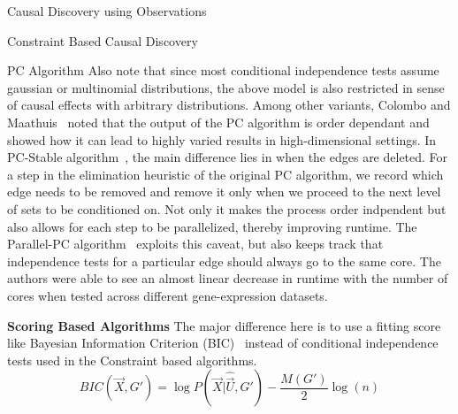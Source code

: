 \documentclass[10pt]{article}
\begin{document}
\begin{psection}[3]{Causal Discovery using Observations}
\begin{psubsection}{Constraint Based Causal Discovery}
\begin{pssubsection}{PC Algorithm}
            Also note that since most conditional independence tests assume gaussian or
            multinomial distributions, the above model is also restricted in sense of
            causal effects with arbitrary distributions. Among other variants, Colombo
            and Maathuis~\cite{colombo2014order} noted that the output of the PC
            algorithm is order dependant and showed how it can lead to highly varied
            results in high-dimensional settings. In PC-Stable
            algorithm~\cite{colombo2014order}, the main difference lies in when the
            edges are deleted. For a step in the elimination heuristic of the original
            PC algorithm, we record which edge needs to be removed and remove it only
            when we proceed to the next level of sets to be conditioned on. Not only it
            makes the process order indpendent but also allows for each step to be
            parallelized, thereby improving runtime. The Parallel-PC
            algorithm~\cite{le2016fast} exploits this caveat, but also keeps track that
            independence tests for a particular edge should always go to the same core.
            The authors were able to see an almost linear decrease in runtime with the
            number of cores when tested across different gene-expression datasets.   
        \end{pssubsection}

    \end{psubsection}
    
    \begin{psubsection}{\textbf{Scoring Based Algorithms}}
        The major difference here is to use a fitting score like Bayesian Information
        Criterion (BIC)~\cite{claeskens2008model} instead of conditional independence
        tests used in the Constraint based algorithms. 
        \begin{equation}
            BIC(\vec{X}, G') = \log P(\vec{X} \vert \hat{\vec{U}}, G') -
            \frac{M(G')}{2}\log(n)
        \end{equation}
    

\end{psubsection}
\end{psection}
\end{document}
